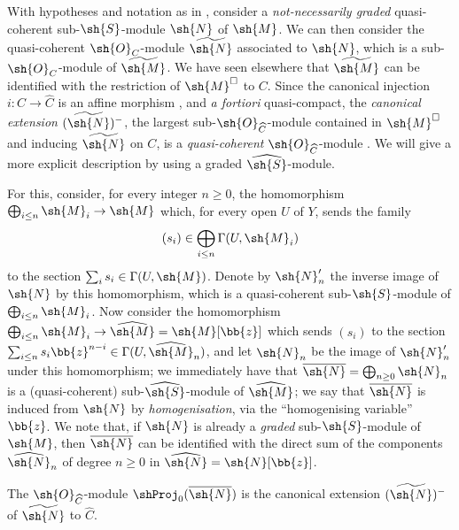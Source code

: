 \begin{env}[8.13.1]
\label{II.8.13.1}
With hypotheses and notation as in , consider a \emph{not-necessarily graded} quasi-coherent sub-$\sh{S}$-module $\sh{N}$ of $\sh{M}$.
We can then consider the quasi-coherent $\sh{O}_C$-module $\widetilde{\sh{N}}$ associated to $\sh{N}$, which is a sub-$\sh{O}_C$-module of $\widetilde{\sh{M}}$.
We have seen elsewhere  that $\widetilde{\sh{M}}$ can be identified with the restriction of $\sh{M}^\square$ to $C$.
Since the canonical injection $i:C\to\widehat{C}$ is an affine morphism , and \emph{a fortiori} quasi-compact, the \emph{canonical extension} $(\widetilde{\sh{N}})^-$, the largest sub-$\sh{O}_{\widehat{C}}$-module contained in $\sh{M}^\square$ and inducing $\widetilde{\sh{N}}$ on $C$, is a \emph{quasi-coherent} $\sh{O}_{\widehat{C}}$-module .
We will give a more explicit description by using a graded $\widehat{\sh{S}}$-module.
\end{env}

\begin{env}[8.13.2]
\label{II.8.13.2}
For this, consider, for every integer $n\geq0$, the homomorphism $\bigoplus_{i\leq n}\sh{M}_i\to\sh{M}$ which, for every open $U$ of $Y$, sends the family
\[
    (s_i) \in \bigoplus_{i\leq n}\Gamma(U,\sh{M}_i)
\]
to the section $\sum_i s_i\in\Gamma(U,\sh{M})$.
Denote by $\sh{N}'_n$ the inverse image of $\sh{N}$ by this homomorphism, which is a quasi-coherent sub-$\sh{S}$-module of $\bigoplus_{i\leq n}\sh{M}_i$.
Now consider the homomorphism $\bigoplus_{i\leq n}\sh{M}_i\to\widehat{\sh{M}}=\sh{M}[\bb{z}]$ which sends $(s_i)$ to the section $\sum_{i\leq n}s_i\bb{z}^{n-i}\in\Gamma(U,\widehat{\sh{M}}_n)$, and let $\sh{N}_n$ be the image of $\sh{N}'_n$ under this homomorphism;
we immediately have that $\overline{\sh{N}}=\bigoplus_{n\geq0}\sh{N}_n$ is a (quasi-coherent) sub-$\widehat{\sh{S}}$-module of $\widehat{\sh{M}}$;
we say that $\overline{\sh{N}}$ is induced from $\sh{N}$ by \emph{homogenisation}, via the ``homogenising variable'' $\bb{z}$.
We note
that, if $\sh{N}$ is already a \emph{graded} sub-$\sh{S}$-module of $\sh{M}$, then $\overline{\sh{N}}$ can be identified with the direct sum of the components $\widehat{\sh{N}}_n$ of degree $n\geq0$ in $\widehat{\sh{N}}=\sh{N}[\bb{z}]$.
\end{env}

\begin{proposition}[8.13.3]
\label{II.8.13.3}
The $\sh{O}_{\widehat{C}}$-module $\shProj_0(\overline{\sh{N}})$ is the canonical extension $(\widetilde{\sh{N}})^-$ of $\widetilde{\sh{N}}$ to $\widehat{C}$.
\end{proposition}

